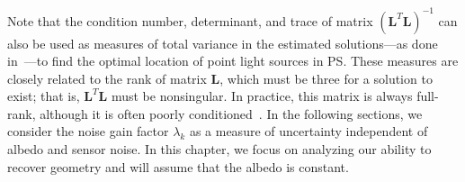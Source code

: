 Note that the condition number, determinant, and trace of matrix $(\mathbf{L}^T\mathbf{L})^{-1}$ can also be used as measures of total variance in the estimated solutions---as done in~\cite{sun-ivc-07}---to find the optimal location of point light sources in PS. These measures are closely related to the rank of matrix $\mathbf{L}$, which must be three for a solution to exist; that is, $\mathbf{L}^T\mathbf{L}$ must be nonsingular. In practice, this matrix is always full-rank, although it is often poorly conditioned~\cite{shen-pg-14}. In the following sections, we consider the noise gain factor $\lambda_k$ as a measure of uncertainty independent of albedo and sensor noise. In this chapter, we focus on analyzing our ability to recover geometry and will assume that the albedo is constant.



